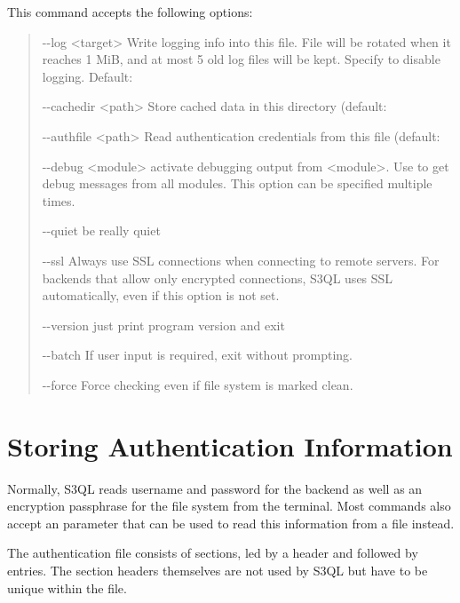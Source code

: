 \documentclass[letterpaper,10pt,english]{sphinxmanual}
\begin{document}
This command accepts the following options:
\begin{quote}
\begin{optionlist}{3cm}
\item [-{-}log \textless{}target\textgreater{}]  
Write logging info into this file. File will be rotated
when it reaches 1 MiB, and at most 5 old log files will
be kept. Specify  to disable logging. Default:
\item [-{-}cachedir \textless{}path\textgreater{}]  
Store cached data in this directory (default: 
\item [-{-}authfile \textless{}path\textgreater{}]  
Read authentication credentials from this file (default:
\item [-{-}debug \textless{}module\textgreater{}]  
activate debugging output from \textless{}module\textgreater{}. Use  to get
debug messages from all modules. This option can be
specified multiple times.
\item [-{-}quiet]  
be really quiet
\item [-{-}ssl]  
Always use SSL connections when connecting to remote
servers. For backends that allow only encrypted
connections, S3QL uses SSL automatically, even if this
option is not set.
\item [-{-}version]  
just print program version and exit
\item [-{-}batch]  
If user input is required, exit without prompting.
\item [-{-}force]  
Force checking even if file system is marked clean.
\end{optionlist}
\end{quote}


\chapter{Storing Authentication Information}
\label{authinfo:storing-authentication-information}\label{authinfo:authinfo}\label{authinfo::doc}
Normally, S3QL reads username and password for the backend as well as
an encryption passphrase for the file system from the terminal. Most
commands also accept an  parameter that can be
used to read this information from a file instead.

The authentication file consists of sections, led by a \code{{[}section{]}}
header and followed by  entries. The section headers
themselves are not used by S3QL but have to be unique within the file.
\end{document}
